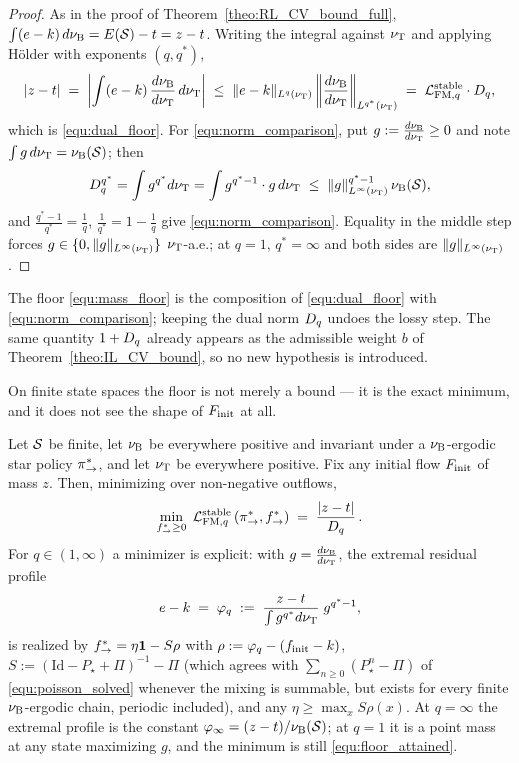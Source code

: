 \begin{proof}
As in the proof of Theorem~\ref{theo:RL_CV_bound_full}, $\int(e-k)\,d\nu_{\mathrm{B}}=E(\mathcal S)-t=z-t$. Writing the
integral against $\nu_{\mathrm{T}}$ and applying H\"older with exponents $(q,q^*)$,
\begin{equation*}
    |z-t| \;=\; \left|\int(e-k)\,\frac{d\nu_{\mathrm{B}}}{d\nu_{\mathrm{T}}}\,d\nu_{\mathrm{T}}\right|
    \;\leq\;\|e-k\|_{L^q(\nu_{\mathrm{T}})}\left\|\frac{d\nu_{\mathrm{B}}}{d\nu_{\mathrm{T}}}\right\|_{L^{q^*}(\nu_{\mathrm{T}})}
    \;=\;\mathcal L_{\mathrm{FM},q}^{\mathrm{stable}}\cdot D_{q} ,
\end{equation*}
which is \eqref{equ:dual_floor}. For \eqref{equ:norm_comparison}, put $g:=\frac{d\nu_{\mathrm{B}}}{d\nu_{\mathrm{T}}}\geq0$ and
note $\int g\,d\nu_{\mathrm{T}}=\nu_{\mathrm{B}}(\mathcal S)$; then
\begin{equation*}
    D_{q}^{q^*}=\int g^{q^*}d\nu_{\mathrm{T}}=\int g^{q^*-1}\cdot g\,d\nu_{\mathrm{T}}
    \;\leq\;\|g\|_{L^\infty(\nu_{\mathrm{T}})}^{q^*-1}\,\nu_{\mathrm{B}}(\mathcal S),
\end{equation*}
and $\frac{q^*-1}{q^*}=\frac1q$, $\frac{1}{q^*}=1-\frac1q$ give
\eqref{equ:norm_comparison}. Equality in the middle step forces $g\in\{0,\|g\|_{L^\infty(\nu_{\mathrm{T}})}\}$
$\nu_{\mathrm{T}}$-a.e.; at $q=1$, $q^*=\infty$ and both sides are $\|g\|_{L^\infty(\nu_{\mathrm{T}})}$.
\end{proof}

The floor \eqref{equ:mass_floor} is the composition of \eqref{equ:dual_floor} with
\eqref{equ:norm_comparison}; keeping the dual norm $D_{q}$ undoes the lossy step. The same
quantity $1+D_{q}$ already appears as the admissible weight $b$ of
Theorem~\ref{theo:IL_CV_bound}, so no new hypothesis is introduced.

On finite state spaces the floor is not merely a bound --- it is the exact minimum, and it
does not see the shape of $F_{\mathrm{init}}$ at all.

\begin{proposition}\label{prop:floor_exact}
Let $\mathcal S$ be finite, let $\nu_{\mathrm{B}}$ be everywhere positive and invariant under a
$\nu_{\mathrm{B}}$-ergodic star policy $\pi_{\rightarrow}^*$, and let $\nu_{\mathrm{T}}$ be everywhere
positive. Fix any initial flow $F_{\mathrm{init}}$ of mass $z$. Then, minimizing over non-negative
outflows,
\begin{equation}\label{equ:floor_attained}
    \min_{f^*_{\rightarrow}\geq0}\;\mathcal L_{\mathrm{FM},q}^{\mathrm{stable}}\left(\pi_{\rightarrow}^*,f^*_{\rightarrow}\right)
    \;=\;\frac{|z-t|}{D_{q}}\,.
\end{equation}
For $q\in(1,\infty)$ a minimizer is explicit: with $g=\frac{d\nu_{\mathrm{B}}}{d\nu_{\mathrm{T}}}$, the extremal residual profile
\begin{equation}\label{equ:extremal_profile}
    e-k \;=\; \varphi_q\;:=\;\frac{z-t}{\int g^{q^*}d\nu_{\mathrm{T}}}\;g^{q^*-1},
\end{equation}
is realized by $f^*_{\rightarrow}=\eta\mathbf 1-S\rho$ with $\rho:=\varphi_q-(f_{\mathrm{init}}-k)$,
$S:=(\mathrm{Id}-P_\star+\Pi)^{-1}-\Pi$ (which agrees with
$\sum_{n\geq0}(P_\star^n-\Pi)$ of \eqref{equ:poisson_solved} whenever the mixing is
summable, but exists for every finite $\nu_{\mathrm{B}}$-ergodic chain, periodic included), and
any $\eta\geq\max_x S\rho(x)$. At $q=\infty$ the extremal profile is the constant
$\varphi_\infty=(z-t)/\nu_{\mathrm{B}}(\mathcal S)$; at $q=1$ it is a point mass at any state
maximizing $g$, and the minimum is still \eqref{equ:floor_attained}.
\end{proposition}

